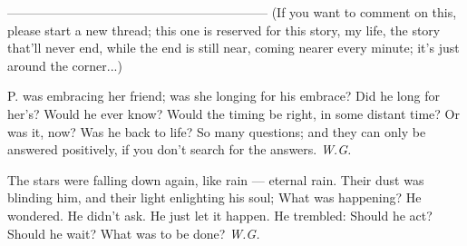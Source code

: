 --------------------------------------------------------------
(If you want to comment on this, please start a new thread; this one is reserved for this story, my life, the story that'll never end, while the end is still near, coming nearer every minute; it's just around the corner...)

P. was embracing her friend; 
was she longing for his embrace? 
Did he long for her's? 
Would he ever know? 
Would the timing be right, 
in some distant time? 
Or was it, now? 
Was he back to life? 
So many questions; 
and they can only be answered positively, 
if you don't search for the answers. 
\emph{W.G.}

The stars were falling down again, 
like rain --- 
eternal rain. 
Their dust was blinding him, 
and their light enlighting his soul; 
What was happening? 
He wondered. 
He didn't ask. 
He just let it happen. 
He trembled: 
Should he act? 
Should he wait? 
What was to be done? 
\emph{W.G.}

